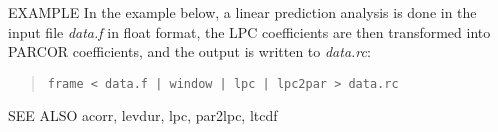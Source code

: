 \begin{options}
\end{options}

\begin{qsection}{EXAMPLE}
In the example below, a linear prediction analysis is
done in the input file {\em data.f} in float format,
the LPC coefficients are then transformed into PARCOR coefficients,
and the output is written to {\em data.rc}:
\begin{quote}
 \verb!frame < data.f | window | lpc | lpc2par > data.rc!
\end{quote} 
\end{qsection}

\begin{qsection}{SEE ALSO}
 acorr, levdur, lpc, par2lpc, ltcdf
\end{qsection}
